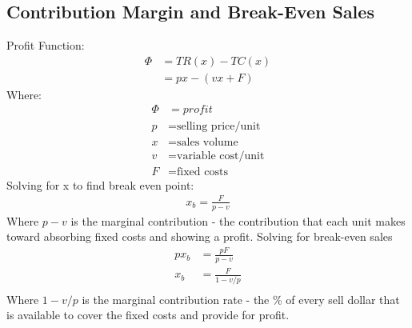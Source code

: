 \documentclass{report} %
\begin{document}
\subsection*{Contribution Margin and Break-Even Sales}
Profit Function:
\begin{equation*}
    \begin{aligned}
        \Phi &= TR(x) - TC(x) \\
        &= px-(vx+F)
    \end{aligned}
\end{equation*}
Where:
\begin{equation*}
    \begin{aligned}
        \Phi &= profit \\
        p &= \text{selling price/unit} \\
        x &= \text{sales volume}\\
        v &= \text{variable cost/unit}\\
        F &= \text{fixed costs}
    \end{aligned}
\end{equation*}
Solving for x to find break even point:
\begin{equation*}
    \begin{aligned}
        x_b = \frac{F}{p-v}
    \end{aligned}
\end{equation*}
Where $p-v$ is the marginal contribution - the contribution that each unit makes toward absorbing fixed costs and showing a profit.
Solving for break-even sales
\begin{equation*}
    \begin{aligned}
        px_b &= \frac{pF}{p-v} \\
        x_b &= \frac{F}{1-v/p} \\
    \end{aligned}
\end{equation*}
Where $1-v/p$ is the marginal contribution rate - the \% of every sell dollar that is available to cover the fixed costs and provide for profit.
\end{document}
